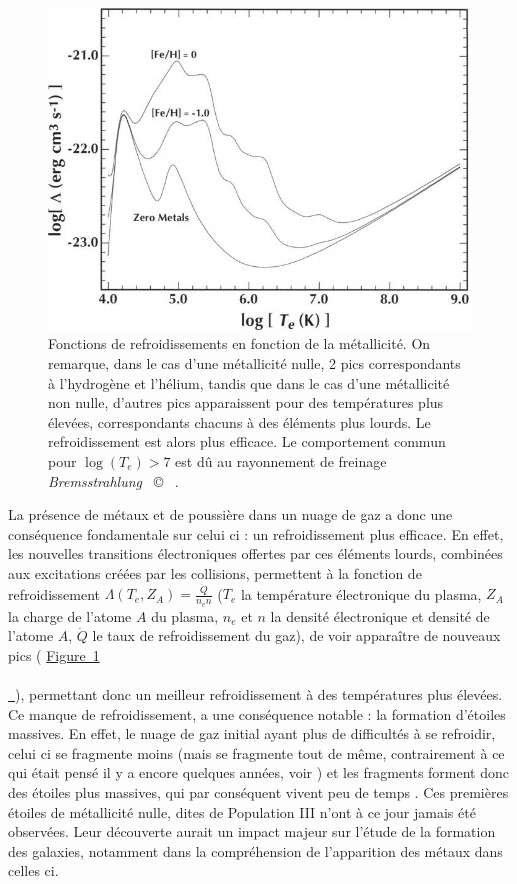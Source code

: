 \documentclass[12pt, a4paper]{article}
\newcommand{\customcite}[1]{\mbox{
  {\small \copyright} \cite{#1}}
}
\newcommand*{\figref}[2][]{%
  \hyperref[{#2}]{%
    Figure~\ref*{#2}%
    \ifx\\#1\\%
    \else
      \,#1%
    \fi
  }%
}
\begin{document}
\begin{figure}[!h]
  \centering
  \includegraphics[scale=1.2]{assets/cooling.jpg}
  \caption{Fonctions de refroidissements en fonction de la métallicité. On remarque, dans le cas d'une métallicité nulle, 2 pics correspondants à l'hydrogène et l'hélium, tandis que dans le cas d'une métallicité non nulle, d'autres pics apparaissent pour des températures plus élevées, correspondants chacuns à des éléments plus lourds. Le refroidissement est alors plus efficace. Le comportement commun pour $\log(T_e) > 7$ est dû au rayonnement de freinage \textit{Bremsstrahlung} \customcite{Astrophysics-of-the-Diffuse-Universe}.}
  \label{fig:cooling}
\end{figure}

La présence de métaux et de poussière dans un nuage de gaz a donc une conséquence fondamentale sur celui ci : un refroidissement plus efficace. En effet, les nouvelles transitions électroniques offertes par ces éléments lourds, combinées aux excitations créées par les collisions, permettent à la fonction de refroidissement $\Lambda(T_e,Z_A) = \frac{\dot{Q}}{n_e n}$ ($T_e$ la température électronique du plasma, $Z_A$ la charge de l'atome $A$ du plasma, $n_e$ et $n$ la densité électronique et densité de l'atome $A$, $\dot Q$ le taux de refroidissement du gaz), de voir apparaître de nouveaux pics (\figref{fig:cooling}), permettant donc un meilleur refroidissement à des températures plus élevées.\\

Ce manque de refroidissement, a une conséquence notable : la formation d'étoiles massives. En effet, le nuage de gaz initial ayant plus de difficultés à se refroidir, celui ci se fragmente moins (mais se fragmente tout de même, contrairement à ce qui était pensé il y a encore quelques années, voir \cite{Tan_2004}) et les fragments forment donc des étoiles plus massives, qui par conséquent vivent peu de temps \parencite{2023ARA&A..61...65K}. Ces premières étoiles de métallicité nulle, dites de Population III n'ont à ce jour jamais été observées. Leur découverte aurait un impact majeur sur l'étude de la formation des galaxies, notamment dans la compréhension de l'apparition des métaux dans celles ci.
\end{document}
